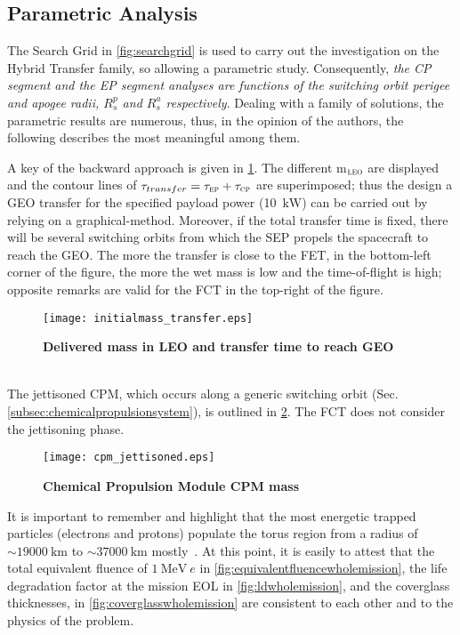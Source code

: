 \subsection{Parametric Analysis}
\label{subsec:parametricanalysis}
The Search Grid in \figurename\ref{fig:searchgrid} is used to carry out the investigation on the Hybrid Transfer family, so allowing a parametric study. 
Consequently, \emph{the CP segment and the EP segment analyses are functions of the switching orbit perigee and apogee radii, $R_s^p$ and $R_s^a$ respectively}.
Dealing with a family of solutions, the parametric results are numerous, thus, in the opinion of the authors, the following describes the most meaningful among them.

A key of the backward approach is given in \figurename\ref{fig:mleotimegeoparametric}. The different m$_{\textsc{leo}}$ are displayed and the contour lines of  $\tau_{transfer}=\tau_{\textsc{ep}}+\tau_{\textsc{cp}}$ are superimposed; thus the design a GEO transfer for the specified payload power (10~$\si{\kilo\watt}$) can be carried out by relying on a graphical-method.
Moreover, if the total transfer time is fixed, there will be several switching orbits from which the SEP propels the spacecraft to reach the GEO. The more the transfer is close to the FET, in the bottom-left corner of the figure, the more the wet mass is low and the time-of-flight is high; opposite remarks are valid for the FCT in the top-right of the figure.
%
\begin{figure}[htp]
\centering
\texttt{[image: initialmass\_transfer.eps]}
\caption{\textbf{Delivered mass in LEO and transfer time to reach GEO}}
\label{fig:mleotimegeoparametric}
\end{figure}
%
\\
The jettisoned CPM, which occurs along a generic switching orbit (Sec.\ref{subsec:chemicalpropulsionsystem}), is outlined in \figurename\ref{fig:cpmmass}. The FCT does not consider the jettisoning phase.
%
\begin{figure}[htp]
\centering
\texttt{[image: cpm\_jettisoned.eps]}
\caption{\textbf{Chemical Propulsion Module CPM mass}}
\label{fig:cpmmass}
\end{figure}
%
It is important to remember and highlight that the most energetic trapped particles (electrons and protons) populate the torus region from a radius of $\sim19000~\si{\kilo\meter}$ to $\sim37000~\si{\kilo\meter}$ mostly~\cite{wertz2011space}. 
At this point, it is easily to attest that the total equivalent fluence of $1~\si{\mega\electronvolt}~e$ in \figurename\ref{fig:equivalentfluencewholemission}, the life degradation factor at the mission EOL in \figurename\ref{fig:ldwholemission}, and the coverglass thicknesses, in \figurename\ref{fig:coverglasswholemission} are consistent to each other and to the physics of the problem.
